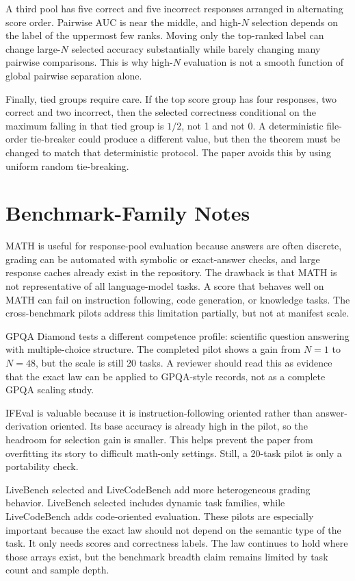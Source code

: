 A third pool has five correct and five incorrect responses arranged in
alternating score order. Pairwise AUC is near the middle, and high-$N$
selection depends on the label of the uppermost few ranks. Moving only the
top-ranked label can change large-$N$ selected accuracy substantially while
barely changing many pairwise comparisons. This is why high-$N$ evaluation is
not a smooth function of global pairwise separation alone.

Finally, tied groups require care. If the top score group has four responses,
two correct and two incorrect, then the selected correctness conditional on
the maximum falling in that tied group is $1/2$, not 1 and not 0. A deterministic
file-order tie-breaker could produce a different value, but then the theorem
must be changed to match that deterministic protocol. The paper avoids this by
using uniform random tie-breaking.

\section{Benchmark-Family Notes}
\label{app:benchmark-notes}

MATH is useful for response-pool evaluation because answers are often
discrete, grading can be automated with symbolic or exact-answer checks, and
large response caches already exist in the repository. The drawback is that
MATH is not representative of all language-model tasks. A score that behaves
well on MATH can fail on instruction following, code generation, or knowledge
tasks. The cross-benchmark pilots address this limitation partially, but not
at manifest scale.

GPQA Diamond tests a different competence profile: scientific question
answering with multiple-choice structure. The completed pilot shows a gain
from $N=1$ to $N=48$, but the scale is still 20 tasks. A reviewer should read
this as evidence that the exact law can be applied to GPQA-style records, not
as a complete GPQA scaling study.

IFEval is valuable because it is instruction-following oriented rather than
answer-derivation oriented. Its base accuracy is already high in the pilot,
so the headroom for selection gain is smaller. This helps prevent the paper
from overfitting its story to difficult math-only settings. Still, a 20-task
pilot is only a portability check.

LiveBench selected and LiveCodeBench add more heterogeneous grading behavior.
LiveBench selected includes dynamic task families, while LiveCodeBench adds
code-oriented evaluation. These pilots are especially important because the
exact law should not depend on the semantic type of the task. It only needs
scores and correctness labels. The law continues to hold where those arrays
exist, but the benchmark breadth claim remains limited by task count and
sample depth.

